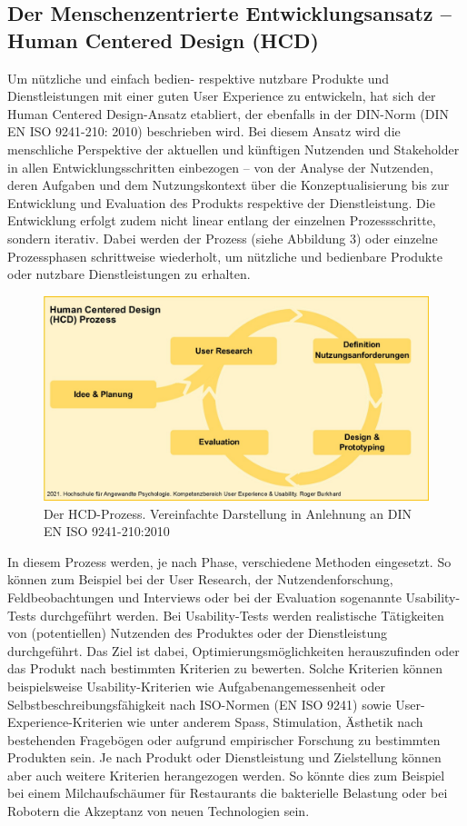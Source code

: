 \documentclass[a4paper,
fontsize=11pt,
oneside,
numbers=noperiodatend,
parskip=half-,
bibliography=totoc,
final
]{scrartcl}
\begin{document}
\hypertarget{der-menschenzentrierte-entwicklungsansatz-human-centered-design-hcd}{%
\subsection{Der Menschenzentrierte Entwicklungsansatz -- Human Centered Design (HCD)}\label{der-menschenzentrierte-entwicklungsansatz-human-centered-design-hcd}}

Um nützliche und einfach bedien- respektive nutzbare Produkte und
Dienstleistungen mit einer guten User Experience zu entwickeln, hat sich
der Human Centered Design-Ansatz etabliert, der ebenfalls in der
DIN-Norm (DIN EN ISO 9241-210: 2010) beschrieben wird. Bei diesem Ansatz
wird die menschliche Perspektive der aktuellen und künftigen Nutzenden
und Stakeholder in allen Entwicklungsschritten einbezogen -- von der
Analyse der Nutzenden, deren Aufgaben und dem Nutzungskontext über die
Konzeptualisierung bis zur Entwicklung und Evaluation des Produkts
respektive der Dienstleistung. Die Entwicklung erfolgt zudem nicht
linear entlang der einzelnen Prozessschritte, sondern iterativ. Dabei
werden der Prozess (siehe Abbildung 3) oder einzelne Prozessphasen
schrittweise wiederholt, um nützliche und bedienbare Produkte oder
nutzbare Dienstleistungen zu erhalten.

\begin{figure}
\centering
\includegraphics[width=.8\textwidth]{img/HCD-Prozess.jpg}
\caption{Der HCD-Prozess. Vereinfachte Darstellung in
Anlehnung an DIN EN ISO 9241-210:2010}
\end{figure}

In diesem Prozess werden, je nach Phase, verschiedene Methoden
eingesetzt. So können zum Beispiel bei der User Research, der
Nutzendenforschung, Feldbeobachtungen und Interviews oder bei der
Evaluation sogenannte Usability-Tests durchgeführt werden. Bei
Usability-Tests werden realistische Tätigkeiten von (potentiellen)
Nutzenden des Produktes oder der Dienstleistung durchgeführt. Das Ziel
ist dabei, Optimierungsmöglichkeiten herauszufinden oder das Produkt
nach bestimmten Kriterien zu bewerten. Solche Kriterien können
beispielsweise Usability-Kriterien wie Aufgabenangemessenheit oder
Selbstbeschreibungsfähigkeit nach ISO-Normen (EN ISO 9241) sowie
User-Experience-Kriterien wie unter anderem Spass, Stimulation, Ästhetik
nach bestehenden Fragebögen oder aufgrund empirischer Forschung zu
bestimmten Produkten sein. Je nach Produkt oder Dienstleistung und
Zielstellung können aber auch weitere Kriterien herangezogen werden. So
könnte dies zum Beispiel bei einem Milchaufschäumer für Restaurants die
bakterielle Belastung oder bei Robotern die Akzeptanz von neuen
Technologien sein.
\end{document}
